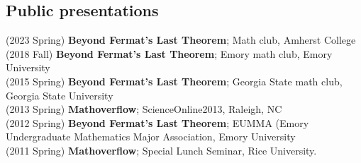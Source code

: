 \documentclass[margin,line]{res}
\begin{document}
\begin{resume}

\section{\sc Public presentations}
(2023 Spring) \textbf{Beyond Fermat's Last Theorem};
Math club, Amherst College
\vspace{.05cm}\\
(2018 Fall) \textbf{Beyond Fermat's Last Theorem};
Emory math club, Emory University
\vspace{.05cm}\\
(2015 Spring) \textbf{Beyond Fermat's Last Theorem};
Georgia State math club, Georgia State University
\vspace{.05cm}\\
(2013 Spring) \textbf{Mathoverflow};
ScienceOnline2013, Raleigh, NC
\vspace{.05cm}\\
(2012 Spring) \textbf{Beyond Fermat's Last Theorem};
EUMMA (Emory Undergraduate Mathematics Major Association, Emory University
\vspace{.05cm}\\
(2011 Spring) \textbf{Mathoverflow};
Special Lunch Seminar, Rice University.
\vspace{.05cm}\\





\end{resume}
\end{document}
